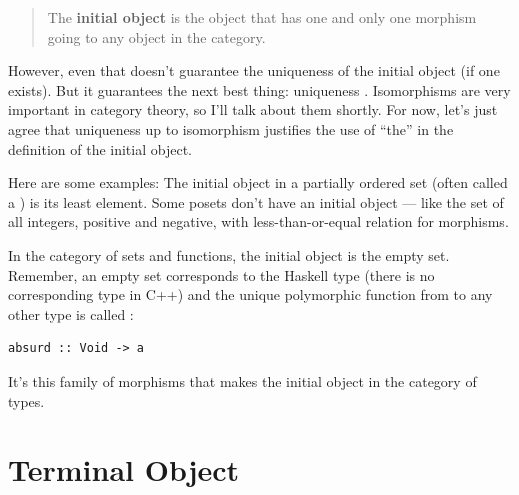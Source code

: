 \begin{quote}
The \textbf{initial object} is the object that has one and only one
morphism going to any object in the category.
\end{quote}

\begin{figure}[H]
\centering
{}
\end{figure}

\noindent
However, even that doesn't guarantee the uniqueness of the initial
object (if one exists). But it guarantees the next best thing:
uniqueness . Isomorphisms are very important in
category theory, so I'll talk about them shortly. For now, let's just
agree that uniqueness up to isomorphism justifies the use of ``the'' in
the definition of the initial object.

Here are some examples: The initial object in a partially ordered set
(often called a ) is its least element. Some posets don't
have an initial object --- like the set of all integers, positive and
negative, with less-than-or-equal relation for morphisms.

In the category of sets and functions, the initial object is the empty
set. Remember, an empty set corresponds to the Haskell type
 (there is no corresponding type in C++) and the unique
polymorphic function from  to any other type is called
:

\begin{verbatim}
absurd :: Void -> a
\end{verbatim}
It's this family of morphisms that makes  the initial
object in the category of types.

\section{Terminal Object}\label{terminal-object}

